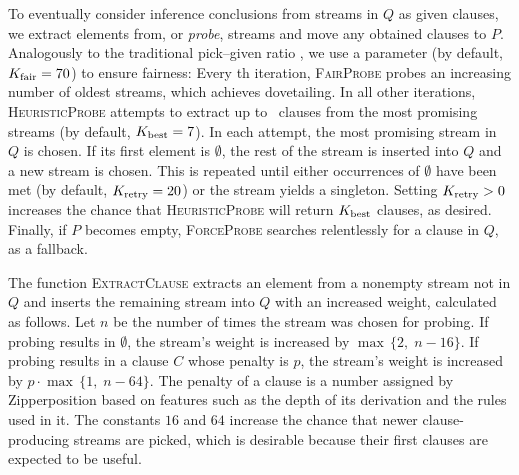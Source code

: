 \documentclass[smallcondensed,draft]{svjour3}     %
\begin{document}

To eventually consider inference conclusions from streams in $Q$ as given
clauses, we extract elements from, or \emph{probe}, streams and move any obtained
clauses to $P$. Analogously to the traditional pick--given ratio
\cite{ss-02-brainiac,mcw-1997-otter}, we use a parameter
\ParamMode{} (by default, $K_{\mathrm{fair}} = 70$) to ensure fairness: Every \ParamMode{}th iteration,
\textsc{FairProbe} probes an increasing number of oldest streams, which achieves
dovetailing. In all other iterations, \textsc{HeuristicProbe} attempts to
extract up to \ParamMaxStreams{}~clauses from the most promising streams (by default,
$K_{\mathrm{best}} = 7$).
In each attempt, the most promising stream in $Q$ is chosen. If its first
element is $\emptyset$, the rest of the stream is inserted into $Q$ and a new stream is
chosen. This is repeated until either \ParamRetry{} occurrences of $\emptyset$ have  been
met (by default, $K_{\mathrm{retry}} = 20$) or the stream yields a singleton. Setting $K_{\mathrm{retry}} > 0$ increases
the chance that \textsc{HeuristicProbe} will return $K_{\mathrm{best}}$ clauses, as desired. Finally, if $P$ becomes empty, \textsc{ForceProbe}
searches relentlessly for a clause in $Q$, as a fallback.

The function \textsc{ExtractClause} extracts an element from a nonempty stream
not in $Q$ and inserts the remaining
stream into $Q$ with an increased weight, calculated as follows.
Let $n$ be the number of times the stream was chosen for
probing. If probing results in $\emptyset$, the stream's weight is increased by
$\max\,\{2{,}\; n-16\}$. If probing results in a clause $C$ whose penalty is
$p$, the stream's weight is increased by $p \cdot \max\,\{1{,}\; n-64\}$. The
penalty of a clause is a number assigned by Zipperposition based on
features such as the depth of its derivation and the rules used in it.
The constants $16$ and $64$ increase the chance that newer clause-producing streams are picked,
which is desirable because their first clauses are expected to be useful.
\end{document}
